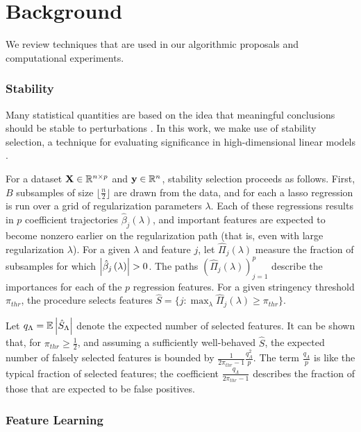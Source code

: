 
\section{Background}
\label{sec:context}

We review techniques that are used in our algorithmic proposals and
computational experiments.

\subsubsection{Stability}

Many statistical quantities are based on the idea that meaningful conclusions
should be stable to perturbations \cite{yu2013stability}. In this work, we make
use of stability selection, a technique for evaluating significance in
high-dimensional linear models \cite{meinshausen2010stability}.

For a dataset $\mathbf{X}\in \mathbb{R}^{n \times p}$ and $\mathbf{y} \in
\mathbb{R}^{n}$, stability selection proceeds as follows. First, $B$ subsamples of
size $\lfloor \frac{n}{2} \rfloor$ are drawn from the data, and for each a lasso
regression is run over a grid of regularization parameters $\lambda$. Each of
these regressions results in $p$ coefficient trajectories
$\hat{\beta}_{j}\left(\lambda\right)$, and important features are expected to
become nonzero earlier on the regularization path (that is, even with large
regularization $\lambda$). For a given $\lambda$ and feature $j$, let
$\hat{\Pi}_{j}\left(\lambda\right)$ measure the fraction of subsamples for which
$\left|\hat{\beta}_j\left(\lambda\right)\right| > 0$. The paths
$\left(\hat{\Pi}_{j}\left(\lambda\right)\right)_{j = 1}^{p}$ describe the
importances for each of the $p$ regression features. For a given stringency
threshold $\pi_{thr}$, the procedure selects features $\hat{S} = \{j :
\max_{\lambda} \hat{\Pi}_{j}\left(\lambda\right) \geq \pi_{thr}\}$.

Let $q_{\Lambda} = \mathbb{E}\left|{\hat{S}_{\Lambda}}\right|$ denote the expected number of
selected features. It can be shown that, for $\pi_{thr} \geq \frac{1}{2}$, and
assuming a sufficiently well-behaved $\hat{S}$, the expected number of falsely
selected features is bounded by $\frac{1}{2\pi_{thr} - 1}
\frac{q_{\Lambda}^2}{p}$. The term $\frac{q_{\Lambda}}{p}$ is like the typical
fraction of selected features; the coefficient $\frac{q_{\Lambda}}{2\pi_{thr} -
  1}$ describes the fraction of those that are expected to be false positives.

\subsubsection{Feature Learning}

